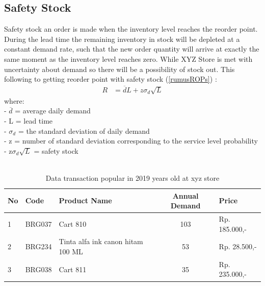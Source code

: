 \documentclass[12pt,a4paper,final]{iopart}
\begin{document}
\subsection{Safety Stock}
Safety stock an order is made when the inventory level reaches the reorder point. During the lead time the remaining inventory in stock will be depleted at a constant demand rate, such that the new order quantity will arrive at exactly the same moment as the inventory level reaches zero. While XYZ Store is met with uncertainty about demand so there will be a possibility of stock out. This following to getting reorder point with safety stock (\ref{rumusROPs}) \cite{Rusell2011}:
\begin{eqnarray}
	\label{rumusROPs}
	R &= \overline{d}L + z\sigma_d\sqrt{L}
\end{eqnarray}
where:\\
- $\overline{d}$ = average daily demand\\
- L = lead time\\
- $\sigma_d$ = the standard deviation of daily demand\\
- z = number of standard deviation corresponding to the service level probability\\
- z$\sigma_d\sqrt{L}$ = safety stock\\ \\
\begin{table}[h!]
	\centering
	\caption{\label{tableBarang} Data transaction popular in 2019 years old at xyz store}
	\begin{tabular}{ lllcl }
		\hline
		\textbf{No} & \textbf{Code} & \textbf{Product Name} & \textbf{Annual Demand} & \textbf{Price} \\
		\hline
		1 & BRG037 & Cart 810 & 103 & Rp. 185.000,-  \\ 
		2 & BRG234 & Tinta alfa ink canon hitam 100 ML & 53 &  Rp. 28.500,-  \\ 
		3 & BRG038 & Cart 811 & 35 & Rp. 235.000,- \\ 
		\hline
	\end{tabular}
\end{table}
\end{document}
